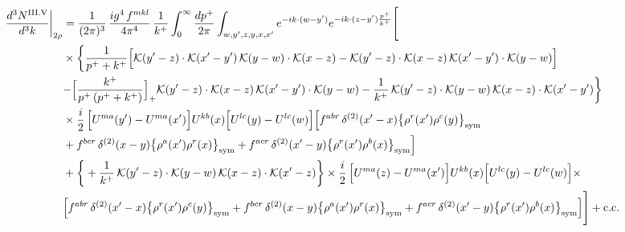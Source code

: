 \documentclass[9pt]{article}
\numberwithin{equation}{section}
\begin{document}
\begin{align}
\frac{d^{3}N^{\rm III.V}}{d^{3}k}\bigg|_{2\rho}&=\frac{1}{(2\pi)^{3}}\,\frac{ig^{4}\,f^{mkl}}{4\pi^{4}}\,\frac{1}{k^{+}}\int_{0}^{\infty}\frac{dp^{+}}{2\pi}\int_{w,y',z,y,x,x'}e^{-ik\cdot{(w-y')}}e^{-ik\cdot{(z-y')}\frac{p^{+}}{k^{+}}}\Bigg[\notag\\
&\times\bigg\{\frac{1}{p^{+}+k^{+}}\Big[\mathcal{K}(y'-z)\cdot\mathcal{K}(x'-y')\,\mathcal{K}(y-w)\cdot\mathcal{K}(x-z)-\mathcal{K}(y'-z)\cdot\mathcal{K}(x-z)\,\mathcal{K}(x'-y')\cdot\mathcal{K}(y-w)\Big]\notag\\
&{-\Big[\frac{k^{+}}{p^{+}\,(p^{+}+k^{+})}\Big]_{+}\mathcal{K}(y'-z)\cdot\mathcal{K}(x-z)\,\mathcal{K}(x'-y')\cdot\mathcal{K}(y-w)}-\frac{1}{k^{+}}\,\mathcal{K}(y'-z)\cdot\mathcal{K}(y-w)\,\mathcal{K}(x-z)\cdot\mathcal{K}(x'-y')\bigg\}\notag\\
&\times \frac{i}{2}\,\Big[U^{ma}(y')-U^{ma}(x')\Big]U^{kb}(x)\Big[U^{lc}(y)-U^{lc}(w)\Big]\Big[f^{abr}\,\delta^{(2)}(x'-x)\big\{\rho^{r}(x')\rho^{c}(y)\big\}_{\rm sym}\notag\\
& +f^{bcr}\,\delta^{(2)}(x-y)\big\{\rho^{a}(x')\rho^{r}(x)\big\}_{\rm sym}+f^{acr}\,\delta^{(2)}(x'-y)\big\{\rho^{r}(x')\rho^{b}(x)\big\}_{\rm sym}\Big]\notag\\
&+\bigg\{+\frac{1}{k^{+}}\,\mathcal{K}(y'-z)\cdot\mathcal{K}(y-w)\,\mathcal{K}(x-z)\cdot\mathcal{K}(x'-z)\bigg\}\times \frac{i}{2}\,\Big[U^{ma}(z)-U^{ma}(x')\Big]U^{kb}(x)\Big[U^{lc}(y)-U^{lc}(w)\Big]\times\,\notag \\ & \Big[f^{abr}\,\delta^{(2)}(x'-x)\big\{\rho^{r}(x')\rho^{c}(y)\big\}_{\rm sym} +f^{bcr}\,\delta^{(2)}(x-y)\big\{\rho^{a}(x')\rho^{r}(x)\big\}_{\rm sym}+f^{acr}\,\delta^{(2)}(x'-y)\big\{\rho^{r}(x')\rho^{b}(x)\big\}_{\rm sym}\Big]\Bigg]+{\rm c.c.}\label{eq:D-III.V-2}
\end{align}
\end{document}
